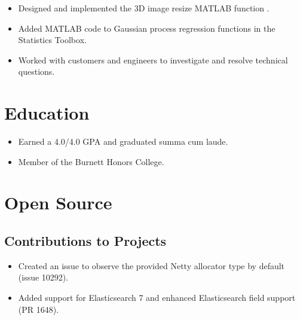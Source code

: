 \documentclass[letterpaper]{resume}
\begin{document}
\begin{minipage}[t]{0.74\columnwidth}
\sectionspace

\vspace{2pt}
\begin{itemize}
\item Designed and implemented the 3D image resize MATLAB function .
\item Added MATLAB code to Gaussian process regression functions in the Statistics Toolbox.
\item Worked with customers and engineers to investigate and resolve technical questions.
\end{itemize}

\sectionspace


\section{Education}

\vspace{2pt}
\begin{itemize}
\item Earned a 4.0/4.0 GPA and graduated summa cum laude.
\item Member of the Burnett Honors College.
\end{itemize}

\sectionspace


\section{Open Source}

\subsection{Contributions to Projects}
\vspace{2pt}
\begin{itemize}
\item Created an issue to observe the provided Netty allocator type by default (issue 10292).
\end{itemize}
\vspace{3pt}
\vspace{2pt}
\begin{itemize}
\item Added support for Elasticsearch 7 and enhanced Elasticsearch field support (PR 1648).
\end{itemize}


\end{minipage}
\end{document}
